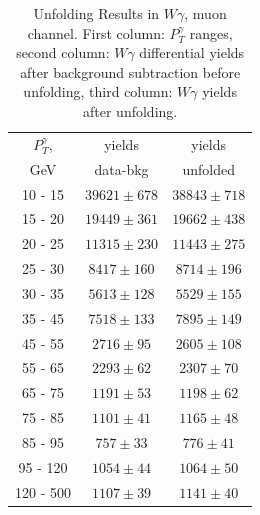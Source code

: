 \begin{table}[h]
  \scriptsize
  \begin{center}
  \caption{Unfolding Results in $W\gamma$, muon channel. First column: $P_T^{\gamma}$ ranges, second column: $W\gamma$ differential yields after background subtraction before unfolding, third column: $W\gamma$ yields after unfolding.}
  \begin{tabular}{|c|c|c|}

  $P_T^{\gamma}$, &  yields   &  yields  \\ 
  GeV           &  data-bkg &  unfolded  \\ \hline

 10 -  15 &     $39621\pm 678$ &     $38843\pm 718$  \\ \hline
 15 -  20 &     $19449\pm 361$ &     $19662\pm 438$  \\ \hline
 20 -  25 &     $11315\pm 230$ &     $11443\pm 275$  \\ \hline
 25 -  30 &     $8417\pm 160$ &     $8714\pm 196$  \\ \hline
 30 -  35 &     $5613\pm 128$ &     $5529\pm 155$  \\ \hline
 35 -  45 &     $7518\pm 133$ &     $7895\pm 149$  \\ \hline
 45 -  55 &     $2716\pm  95$ &     $2605\pm 108$  \\ \hline
 55 -  65 &     $2293\pm  62$ &     $2307\pm  70$  \\ \hline
 65 -  75 &     $1191\pm  53$ &     $1198\pm  62$  \\ \hline
 75 -  85 &     $1101\pm  41$ &     $1165\pm  48$  \\ \hline
 85 -  95 &     $757\pm  33$ &     $776\pm  41$  \\ \hline
 95 - 120 &     $1054\pm  44$ &     $1064\pm  50$  \\ \hline
120 - 500 &     $1107\pm  39$ &     $1141\pm  40$  \\ \hline
  \end{tabular}
  \label{tab:unf_results_MUON_WGamma}
  \end{center}
\end{table}

